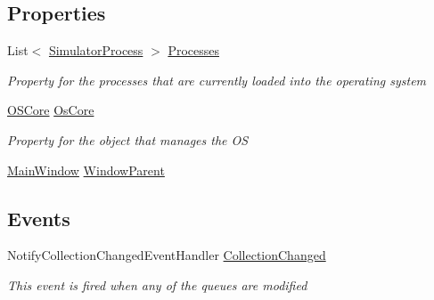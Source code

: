 \subsection*{Properties}
\begin{DoxyCompactItemize}
\item 
List$<$ \hyperlink{class_c_p_u___o_s___simulator_1_1_operating___system_1_1_simulator_process}{Simulator\+Process} $>$ \hyperlink{class_c_p_u___o_s___simulator_1_1_operating_system_main_window_aadbbb1f580d767211e180a95ec71b849}{Processes}
\begin{DoxyCompactList}\small\item\em Property for the processes that are currently loaded into the operating system \end{DoxyCompactList}\item 
\hyperlink{class_c_p_u___o_s___simulator_1_1_operating___system_1_1_o_s_core}{O\+S\+Core} \hyperlink{class_c_p_u___o_s___simulator_1_1_operating_system_main_window_ad714e0ed6e880516f8afc3f1531a2d14}{Os\+Core}
\begin{DoxyCompactList}\small\item\em Property for the object that manages the O\+S \end{DoxyCompactList}\item 
\hyperlink{class_c_p_u___o_s___simulator_1_1_main_window}{Main\+Window} \hyperlink{class_c_p_u___o_s___simulator_1_1_operating_system_main_window_ab268729468fdd46d53fa8a562f99bda1}{Window\+Parent}
\end{DoxyCompactItemize}
\subsection*{Events}
\begin{DoxyCompactItemize}
\item 
Notify\+Collection\+Changed\+Event\+Handler \hyperlink{class_c_p_u___o_s___simulator_1_1_operating_system_main_window_af8aeaf0c83021caf8f735ea7c051848c}{Collection\+Changed}
\begin{DoxyCompactList}\small\item\em This event is fired when any of the queues are modified \end{DoxyCompactList}\end{DoxyCompactItemize}
